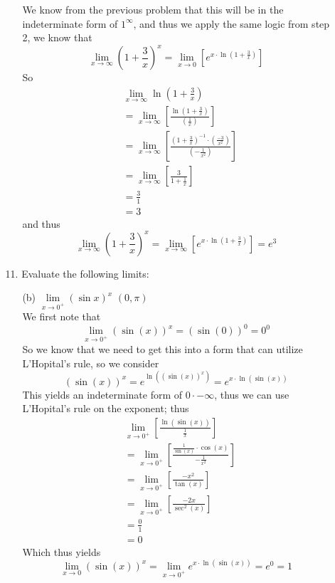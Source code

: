 \documentclass[12pt,letterpaper]{article}
\theoremstyle{case}
\theoremstyle{definition}
\begin{document}
\begin{enumerate}
\begin{enumerate}
\begin{enumerate}
				We know from the previous problem that this will be in the indeterminate form of $1^\infty$, and thus we apply the same logic from step 2, we know that
				\[\lim\limits_{x \to \infty} \left(1+\frac{3}{x}\right)^x = \lim\limits_{x \to 0} \left[e^{x \cdot \ln \left(1+\frac{3}{x}\right)}\right]\]
				So
				\begin{align*}
					&\lim\limits_{x \to \infty} \ln \left(1+\frac{3}{x}\right) \\
					&= \lim\limits_{x \to \infty} \left[\frac{\ln(1+\frac{3}{x})}{\left(\frac{1}{x}\right)}\right] \\
					&= \lim\limits_{x \to \infty} \left[\frac{\left(1+\frac{3}{x}\right)^{-1}\cdot \left(\frac{-3}{x^2}\right)}{\left(-\frac{1}{x^2}\right)}\right] \\
					&= \lim\limits_{x \to \infty} \left[\frac{3}{1+\frac{1}{x}}\right] \\
					&= \frac{3}{1} \\
					&= 3
				\end{align*}
				and thus
				\[\lim\limits_{x \to \infty} \left(1+\frac{3}{x}\right)^x = \lim\limits_{x \to \infty} \left[e^{x \cdot \ln \left(1+\frac{3}{x}\right)}\right]=e^3\]
			\end{enumerate}
			\item[11.] Evaluate the following limits:
			\begin{enumerate}
				\item[(b)] $\lim\limits_{x \to 0^+} (\sin x)^x$    $(0, \pi)$\\
				
				We first note that
				\[\lim\limits_{x \to 0^+} (\sin (x))^x=(\sin(0))^0 = 0^0\]
				So we know that we need to get this into a form that can utilize L'Hopital's rule, so we consider
				\[(\sin(x))^x=e^{\ln((\sin(x))^x)}=e^{x\cdot\ln(\sin(x))}\]
				This yields an indeterminate form of $0 \cdot -\infty$, thus we can use L'Hopital's rule on the exponent; thus
				\begin{align*}
					&\lim\limits_{x \to 0^+} \left[\frac{\ln(\sin(x))}{\frac{1}{x}}\right] \\
					&= \lim\limits_{x \to 0^+} \left[\frac{\frac{1}{\sin(x)}\cdot \cos(x)}{-\frac{1}{x^2}}\right] \\
					&= \lim\limits_{x \to 0^+} \left[\frac{-x^2}{\tan(x)}\right] \\
					&= \lim\limits_{x \to 0^+} \left[\frac{-2x}{\sec^2(x)}\right] \\
					&= \frac{0}{1} \\
					&= 0
				\end{align*}
				Which thus yields
				\[\lim\limits_{x \to 0} (\sin(x))^x=\lim\limits_{x \to 0^+} e^{x \cdot \ln(\sin(x))}= e^0=1\]
				

\end{enumerate}
\end{enumerate}
\end{enumerate}
\end{document}

